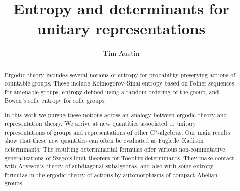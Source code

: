 \documentclass[12pt,a4paper]{article}
\numberwithin{equation}{section}
\theoremstyle{remark}
\begin{document}
\title{Entropy and determinants for unitary representations}


\author{Tim Austin}




\maketitle
\RenewDocumentCommand{\headrulewidth}{}{0cm}
\thispagestyle{fancy}
\fancyhf{}

\begin{abstract}
Ergodic theory includes several notions of entropy for probability-preserving actions of countable groups.  These include Kolmogorov--Sinai entropy based on F\o lner sequences for amenable groups, entropy defined using a random ordering of the group, and Bowen's sofic entropy for sofic groups.

In this work we pursue these notions across an analogy between ergodic theory and representation theory. We arrive at new quantities associated to unitary representations of groups and representations of other C*-algebras.  Our main results show that these new quantities can often be evaluated as Fuglede--Kadison determinants.  The resulting determinantal formulas offer various non-commutative generalizations of Szeg\H{o}'s limit theorem for Toeplitz determinants.  They make contact with Arveson's theory of subdiagonal subalgebras, and also with some entropy formulas in the ergodic theory of actions by automorphisms of compact Abelian groups.
\end{abstract}
\vspace{7pt}




\setcounter{tocdepth}{1}
\tableofcontents

\pagestyle{plain}
\end{document}
